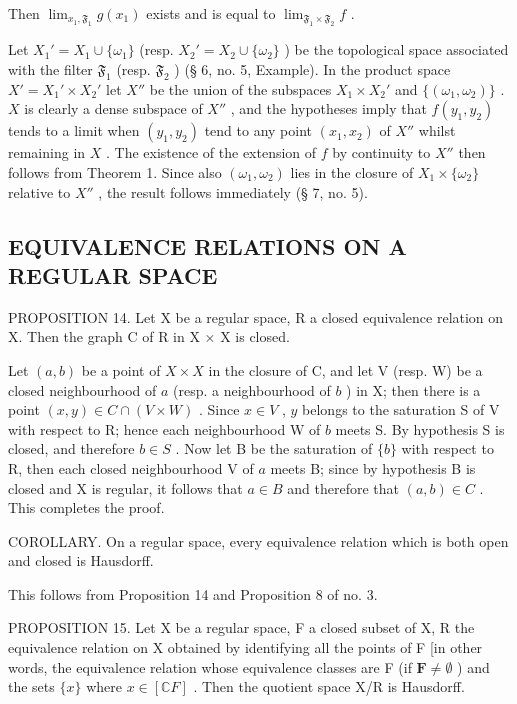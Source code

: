Then \(\lim_{x_1, \mathfrak{F}_1} g(x_1)\) exists and is equal to \(\lim_{\mathfrak{F}_1 \times \mathfrak{F}_2} f\) .

Let \(X_1' = X_1 \cup \{ \omega_1 \}\) (resp. \(X_2' = X_2 \cup \{ \omega_2 \}\) ) be the topological space associated with the filter \(\mathfrak{F}_1\) (resp. \(\mathfrak{F}_2\) ) (§ 6, no. 5, Example). In the product space \(X' = X_1' \times X_2'\) let \(X''\) be the union of the subspaces \(X_1 \times X_2'\) and \(\{ (\omega_1, \omega_2) \}\) . \(X\) is clearly a dense subspace of \(X''\) , and the hypotheses imply that \(f(y_1, y_2)\) tends to a limit when \((y_1, y_2)\) tend to any point \((x_1, x_2)\) of \(X''\) whilst remaining in \(X\) . The existence of the extension of \(f\) by continuity to \(X''\) then follows from Theorem 1. Since also \((\omega_1, \omega_2)\) lies in the closure of \(X_1 \times \{ \omega_2 \}\) relative to \(X''\) , the result follows immediately (§ 7, no. 5).

\subsection{EQUIVALENCE RELATIONS ON A REGULAR SPACE}

PROPOSITION 14. Let X be a regular space, R a closed equivalence relation on X. Then the graph C of R in X × X is closed.

Let \((a, b)\) be a point of \(X \times X\) in the closure of C, and let V (resp. W) be a closed neighbourhood of \(a\) (resp. a neighbourhood of \(b\) ) in X; then there is a point \((x, y) \in C \cap (V \times W)\) . Since \(x \in V\) , \(y\) belongs to the saturation S of V with respect to R; hence each neighbourhood W of \(b\) meets S. By hypothesis S is closed, and therefore \(b \in S\) . Now let B be the saturation of \(\{b\}\) with respect to R, then each closed neighbourhood V of \(a\) meets B; since by hypothesis B is closed and X is regular, it follows that \(a \in B\) and therefore that \((a, b) \in C\) . This completes the proof.

COROLLARY. On a regular space, every equivalence relation which is both open and closed is Hausdorff.

This follows from Proposition 14 and Proposition 8 of no. 3.

PROPOSITION 15. Let X be a regular space, F a closed subset of X, R the equivalence relation on X obtained by identifying all the points of F {[}in other words, the equivalence relation whose equivalence classes are F (if \(\mathbf{F} \neq \emptyset\) ) and the sets \(\{x\}\) where \(x \in [\mathbb{C}F]\) . Then the quotient space X/R is Hausdorff.

